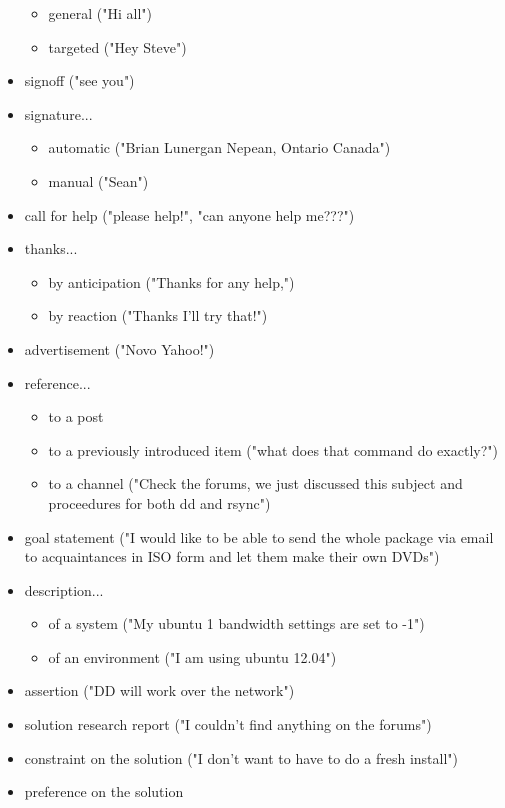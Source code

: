 \documentclass[11pt]{article}
\begin{document}
\begin{itemize}
		\begin{itemize}
			\item general ("Hi all")
			\item targeted ("Hey Steve")
		\end{itemize}
	\item signoff ("see you")
	\item signature...
		\begin{itemize}
			\item automatic ("Brian Lunergan Nepean, Ontario Canada")
			\item manual ("Sean")
		\end{itemize}
	\item call for help ("please help!", "can anyone help me???")
	\item thanks...
		\begin{itemize}
			\item by anticipation ("Thanks for any help,")
			\item by reaction ("Thanks I'll try that!")
		\end{itemize}
	\item advertisement ("Novo Yahoo!")
	\item reference...
		\begin{itemize}
			\item to a post
			\item to a previously introduced item ("what does that command do exactly?")
			\item to a channel ("Check the forums, we just discussed this subject and proceedures for both dd and rsync")
		\end{itemize}
	\item goal statement ("I would like to be able to send the whole package via email to acquaintances in ISO form and let them make their own DVDs")
	\item description...
		\begin{itemize}
			\item of a system ("My ubuntu 1 bandwidth settings are set to -1")
			\item of an environment ("I am using ubuntu 12.04")
		\end{itemize}
	\item assertion ("DD will work over the network")
	\item solution research report ("I couldn't find anything on the forums")
	\item constraint on the solution ("I don't want to have to do a fresh install")
	\item preference on the solution

\end{itemize}
\end{document}
